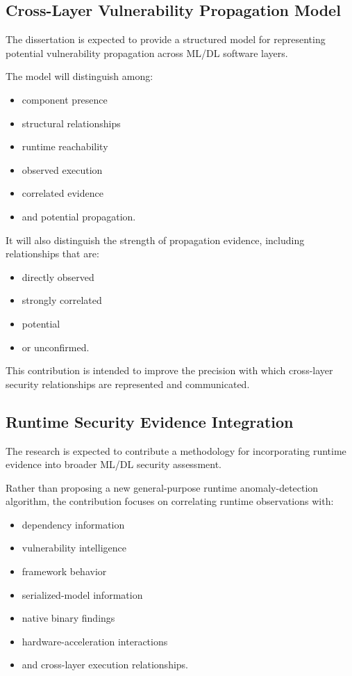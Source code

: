 \documentclass[
  12pt,
  letterpaper,
  oneside]{report}
\providecommand{\tightlist}{%
  \setlength{\itemsep}{0pt}\setlength{\parskip}{0pt}}
\begin{document}
\subsection{Cross-Layer Vulnerability Propagation Model}\label{1253-cross-layer-vulnerability-propagation-model}

The dissertation is expected to provide a structured model for
representing potential vulnerability propagation across ML/DL software
layers.

The model will distinguish among:

\begin{itemize}
\tightlist
\item
  component presence
\item
  structural relationships
\item
  runtime reachability
\item
  observed execution
\item
  correlated evidence
\item
  and potential propagation.
\end{itemize}

It will also distinguish the strength of propagation evidence, including
relationships that are:

\begin{itemize}
\tightlist
\item
  directly observed
\item
  strongly correlated
\item
  potential
\item
  or unconfirmed.
\end{itemize}

This contribution is intended to improve the precision with which
cross-layer security relationships are represented and communicated.

\subsection{Runtime Security Evidence Integration}\label{1254-runtime-security-evidence-integration}

The research is expected to contribute a methodology for incorporating
runtime evidence into broader ML/DL security assessment.

Rather than proposing a new general-purpose runtime anomaly-detection
algorithm, the contribution focuses on correlating runtime observations
with:

\begin{itemize}
\tightlist
\item
  dependency information
\item
  vulnerability intelligence
\item
  framework behavior
\item
  serialized-model information
\item
  native binary findings
\item
  hardware-acceleration interactions
\item
  and cross-layer execution relationships.
\end{itemize}
\end{document}
